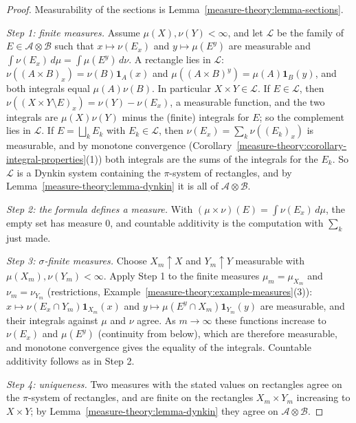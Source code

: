 \begin{proof}
Measurability of the sections is Lemma~\ref{measure-theory:lemma-sections}.

\emph{Step 1: finite measures.} Assume $\mu(X), \nu(Y) < \infty$, and let $\mathcal{L}$ be the family of $E \in \mathcal{A} \otimes \mathcal{B}$ such that $x \mapsto \nu(E_x)$ and $y \mapsto \mu(E^y)$ are
measurable and $\int\nu(E_x)\,d\mu = \int\mu(E^y)\,d\nu$. A rectangle lies in $\mathcal{L}$: $\nu((A \times B)_x) = \nu(B)\mathbf{1}_A(x)$ and $\mu((A \times B)^y) = \mu(A)\mathbf{1}_B(y)$, and both
integrals equal $\mu(A)\nu(B)$. In particular $X \times Y \in \mathcal{L}$. If $E \in \mathcal{L}$, then $\nu((X \times Y \setminus E)_x) = \nu(Y) - \nu(E_x)$, a measurable function, and the two integrals
are $\mu(X)\nu(Y)$ minus the (finite) integrals for $E$; so the complement lies in $\mathcal{L}$. If $E = \bigsqcup_kE_k$ with $E_k \in \mathcal{L}$, then $\nu(E_x) = \sum_k\nu((E_k)_x)$ is measurable,
and by monotone convergence (Corollary~\ref{measure-theory:corollary-integral-properties}(1)) both integrals are the sums of the integrals for the $E_k$. So $\mathcal{L}$ is a Dynkin system
containing the $\pi$-system of rectangles, and by Lemma~\ref{measure-theory:lemma-dynkin} it is all of $\mathcal{A} \otimes \mathcal{B}$.

\emph{Step 2: the formula defines a measure.} With $(\mu \times \nu)(E) = \int\nu(E_x)\,d\mu$, the empty set has measure $0$, and countable additivity is the computation with $\sum_k$ just made.

\emph{Step 3: $\sigma$-finite measures.} Choose $X_m \uparrow X$ and $Y_m \uparrow Y$ measurable with $\mu(X_m), \nu(Y_m) < \infty$. Apply Step 1 to the finite measures $\mu_m = \mu_{X_m}$ and
$\nu_m = \nu_{Y_m}$ (restrictions, Example~\ref{measure-theory:example-measures}(3)): $x \mapsto \nu(E_x \cap Y_m)\mathbf{1}_{X_m}(x)$ and $y \mapsto \mu(E^y \cap X_m)\mathbf{1}_{Y_m}(y)$ are measurable, and their
integrals against $\mu$ and $\nu$ agree. As $m \to \infty$ these functions increase to $\nu(E_x)$ and $\mu(E^y)$ (continuity from below), which are therefore measurable, and monotone convergence gives
the equality of the integrals. Countable additivity follows as in Step 2.

\emph{Step 4: uniqueness.} Two measures with the stated values on rectangles agree on the $\pi$-system of rectangles, and are finite on the rectangles $X_m \times Y_m$ increasing to $X \times Y$; by
Lemma~\ref{measure-theory:lemma-dynkin} they agree on $\mathcal{A} \otimes \mathcal{B}$.
\end{proof}

